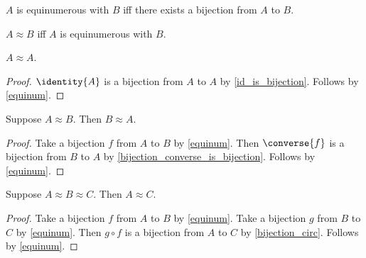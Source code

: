 




\begin{definition}\label{equinum}
    $A$ is equinumerous with $B$ iff there exists a bijection from $A$ to $B$.
\end{definition}

\begin{abbreviation}\label{approx}
    $A\approx B$ iff $A$ is equinumerous with $B$.
\end{abbreviation}

\begin{proposition}\label{equinum_refl}
    $A\approx A$.
\end{proposition}
\begin{proof}
    $\identity{A}$ is a bijection from $A$ to $A$ by \cref{id_is_bijection}.
    Follows by \cref{equinum}.
\end{proof}

\begin{proposition}\label{equinum_sym}
    Suppose $A\approx B$. Then $B\approx A$.
\end{proposition}
\begin{proof}
    Take a bijection $f$ from $A$ to $B$ by \cref{equinum}.
    Then $\converse{f}$ is a bijection from $B$ to $A$ by \cref{bijection_converse_is_bijection}.
    Follows by \cref{equinum}.
\end{proof}

\begin{proposition}\label{equinum_tran}
    Suppose $A\approx B\approx C$. Then $A\approx C$.
\end{proposition}
\begin{proof}
    Take a bijection $f$ from $A$ to $B$ by \cref{equinum}.
    Take a bijection $g$ from $B$ to $C$ by \cref{equinum}.
    Then $g\circ f$ is a bijection from $A$ to $C$ by \cref{bijection_circ}.
    Follows by \cref{equinum}.
\end{proof}



